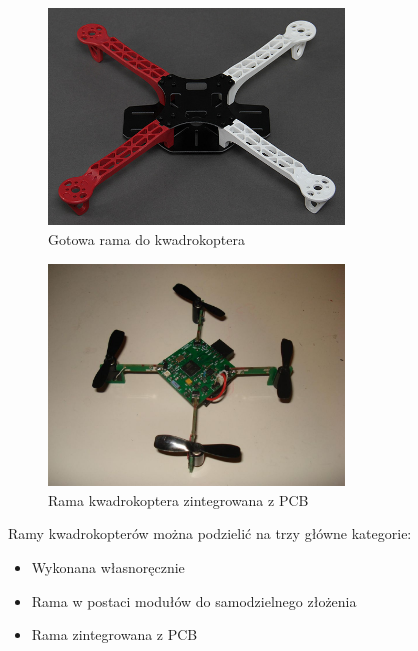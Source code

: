 \begin{figure}[H]
	\centering
		\includegraphics[width=0.7\textwidth]{Pictures/quadrotor_frame.jpg}
	\caption[Gotowa rama do kwadrokoptera]{Gotowa rama do kwadrokoptera}
	\label{fig:quadrotor_frame.jpg}
\end{figure}

\begin{figure}[H]
	\centering
		\includegraphics[width=0.7\textwidth]{Pictures/picocopter.jpg}
	\caption[Rama kwadrokoptera zintegrowana z PCB]{Rama kwadrokoptera zintegrowana z PCB}
	\label{fig:picocopter.jpg}
\end{figure}


Ramy kwadrokopterów można podzielić na trzy główne kategorie:

\begin{itemize}
	\item Wykonana własnoręcznie
	\item Rama w postaci modułów do samodzielnego złożenia
	\item Rama zintegrowana z PCB
\end{itemize}

